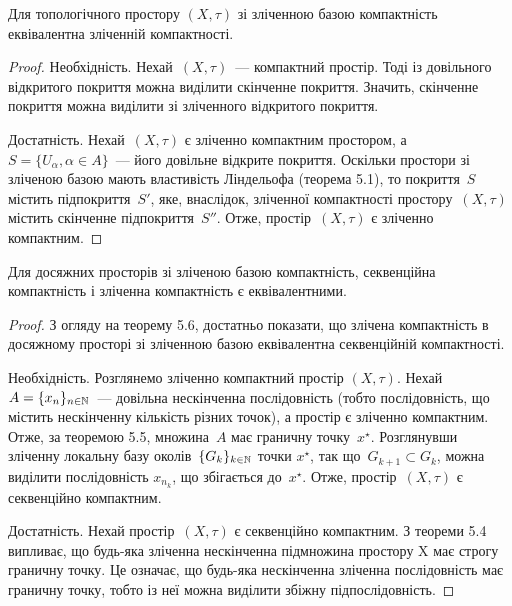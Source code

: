 \begin{theorem}
Для топологічного простору
$(X, \tau)$ зі зліченною базою компактність еквівалентна
зліченній компактності.
\end{theorem}

\begin{proof}
Необхідність. Нехай~$(X, \tau)$~--- компактний
простір. Тоді із довільного відкритого покриття можна
виділити скінченне покриття. Значить, скінченне покриття
можна виділити зі зліченного відкритого покриття.

Достатність. Нехай~$(X, \tau)$ є зліченно компактним
простором, а~$S = \{U_\alpha, \alpha \in A\}$~--- його довільне відкрите
покриття. Оскільки простори зі зліченою базою мають
властивість Ліндельофа (теорема 5.1), то покриття~$S$
містить підпокриття~$S'$, яке, внаслідок, зліченної
компактності простору~$(X, \tau)$ містить скінченне
підпокриття~$S''$. Отже, простір~$(X, \tau)$ є зліченно
компактним.
\end{proof}

\begin{theorem}
Для досяжних просторів зі зліченою базою
компактність, секвенційна компактність і зліченна
компактність є еквівалентними.
\end{theorem}

\begin{proof}
З огляду на теорему 5.6, достатньо показати,
що злічена компактність в досяжному просторі зі зліченною
базою еквівалентна секвенційній компактності.

Необхідність. Розглянемо зліченно компактний простір
$(X, \tau)$. Нехай~$A = \{x_n\}_{n \in \mathbb{N}}$~--- довільна нескінченна
послідовність (тобто послідовність, що містить нескінченну
кількість різних точок), а простір є зліченно компактним.
Отже, за теоремою 5.5, множина~$A$ має граничну точку~$x^\star$.
Розглянувши зліченну локальну базу околів~$\{G_k\}_{k \in \mathbb{N}}$ точки
$x^\star$, так що~$G_{k + 1} \subset G_k$, можна виділити послідовність
$x_{n_k}$, що
збігається до~$x^\star$. Отже, простір~$(X, \tau)$ є секвенційно
компактним.

Достатність. Нехай простір~$(X, \tau)$ є секвенційно
компактним. З теореми 5.4 випливає, що будь-яка зліченна
нескінченна підмножина простору X має строгу граничну
точку. Це означає, що будь-яка нескінченна зліченна
послідовність має граничну точку, тобто із неї можна
виділити збіжну підпослідовність.
\end{proof}

